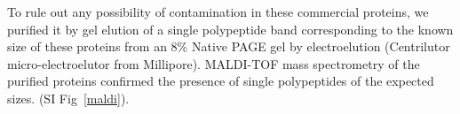 To rule out any possibility of contamination in these commercial proteins, we purified it by gel elution of a single polypeptide band corresponding to the 
known size of these proteins from an 8\% Native PAGE gel by electroelution (Centrilutor micro-electroelutor from Millipore). 
MALDI-TOF mass spectrometry of the purified proteins confirmed the presence of single polypeptides of the expected sizes.
(SI Fig~\ref{maldi}). 
